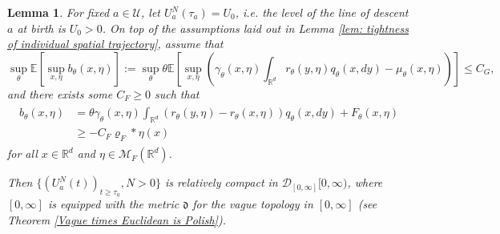 \documentclass[12pt]{article}
\newtheorem{lemma}[theorem]{Lemma}
\newcommand{\IR}{\mathbb R}
\begin{document}
\begin{lemma} \label{lem:tightness of levels} For fixed $a\in \mathcal{U}$, let $U^N_{a}(\tau_a)=U_0$, i.e. the level of the line of descent $a$ at birth is $U_0>0$.
On top of the assumptions laid out in Lemma \ref{lem: tightness of individual spatial trajectory}, assume that 
$$
    \sup_{\theta}\mathbb{E}\left[ \sup_{x, \eta}b_\theta(x, \eta) \right]
    :=
    \sup_{\theta}
    \theta 
    \mathbb{E}\left[ \sup_{x, \eta} \left(
    \gamma_\theta(x,\eta) \int_{\IR^d} r_\theta(y, \eta) q_\theta(x, dy)
    -
    \mu_\theta(x,\eta)
    \right)\right] 
    \leq C_G,
$$
and there exists some $C_F \geq 0$ such that
\begin{align} 
\begin{split}
b_{\theta}(x, \eta)
&=
    \theta \gamma_{\theta}(x, \eta) \int_{\IR^d} \left( r_{\theta}(y, \eta) - r_{\theta}(x, \eta) \right) q_{\theta}(x, dy)
    + F_{\theta}(x, \eta) \\
& \geq - C_F \varrho_F*\eta(x)
\end{split}
\end{align}
for all $x \in \IR^d$ and  $\eta \in \mathcal{M}_{F}(\IR^d)$.

Then
$\{(U^{N}_{a}(t))_{t \geq \tau_a}, N >0\}$ is relatively compact in 
$\mathcal{D}_{[0,\infty]}[0,\infty )$, where $[0,\infty]$ is equipped with the metric $\mathfrak{d}$ for the vague topology in $[0,\infty]$ (see Theorem  \ref{Vague times Euclidean is Polish}).
\end{lemma}
\end{document}

